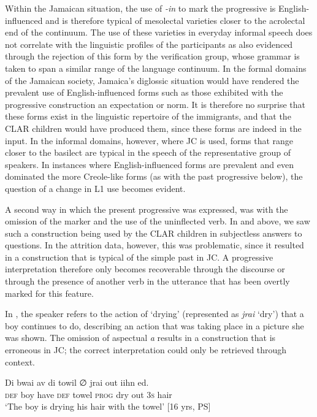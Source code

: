 \documentclass[output=paper,colorlinks,citecolor=brown]{langscibook}
\begin{document}
Within the Jamaican situation, the use of \textit{{}-in} to mark the progressive is English-influenced and is therefore typical of mesolectal varieties closer to the acrolectal end of the continuum. The use of these varieties in everyday informal speech does not correlate with the linguistic profiles of the participants as also evidenced through the rejection of this form by the verification group, whose grammar is taken to span a similar range of the language continuum. In the formal domains of the Jamaican society, Jamaica’s diglossic situation would have rendered the prevalent use of English-influenced forms such as those exhibited with the progressive construction an expectation or norm. It is therefore no surprise that these forms exist in the linguistic repertoire of the immigrants, and that the CLAR children would have produced them, since these forms are indeed in the input. In the informal domains, however, where JC is used, forms that range closer to the basilect are typical in the speech of the representative group of speakers. In instances where English-influenced forms are prevalent and even dominated the more Creole-like forms (as with the past progressive below), the question of a change in L1 use becomes evident.

A second way in which the present progressive was expressed, was with the omission of the marker and the use of the uninflected verb. In  and  above, we saw such a construction being used by the CLAR children in subjectless answers to questions. In the attrition data, however, this was problematic, since it resulted in a construction that is typical of the simple past in JC. A progressive interpretation therefore only becomes recoverable through the discourse or through the presence of another verb in the utterance that has been overtly marked for this feature.

In , the speaker refers to the action of ‘drying’ (represented as \textit{jrai} ‘dry’) that a boy continues to do, describing an action that was taking place in a picture she was shown. The omission of aspectual \textit{a} results in a construction that is erroneous in JC; the correct interpretation could only be retrieved through context.

\ea \label{bkm:messamK:32}
\gll  Di   bwai av     di     towil ∅  jrai out iihn   ed.\\
\textsc{def} boy   have \textsc{def} towel  \textsc{prog} dry  out 3\textsc{s}     hair\\
 \glt `The boy is drying his hair with the towel’       [16 yrs, PS]
\z
\end{document}
